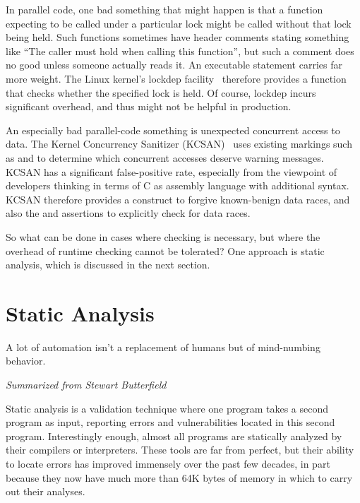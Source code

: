 In parallel code, one bad something that might happen is that
a function expecting to be called under a particular lock might be called
without that lock being held.
Such functions sometimes have header comments stating something like
``The caller must hold  when calling this function'', but
such a comment does no good unless someone actually reads it.
An executable statement carries far more weight.
The Linux kernel's lockdep
facility~\cite{JonathanCorbet2006lockdep,StevenRostedt2011locdepCryptic}
therefore provides a  function that checks
whether the specified lock is held.
Of course, lockdep incurs significant overhead, and thus might not be
helpful in production.

An especially bad parallel-code something is unexpected concurrent
access to data.
The Kernel Concurrency Sanitizer (KCSAN)~\cite{JonathanCorbet2019KCSAN}
uses existing markings such as  and 
to determine which concurrent accesses deserve warning messages.
KCSAN has a significant false-positive rate, especially from the
viewpoint of developers thinking in terms of C as assembly language
with additional syntax.
KCSAN therefore provides a  construct to forgive
known-benign data races, and also the 
and  assertions to explicitly check
for data races\cite{MarcoElver2020FearDataRaceDetector1,MarcoElver2020FearDataRaceDetector2}.

So what can be done in cases where checking is necessary, but where the
overhead of runtime checking cannot be tolerated?
One approach is static analysis, which is discussed in the next section.

\section{Static Analysis}
\label{sec:debugging:Static Analysis}
%
\epigraph{A lot of automation isn't a replacement of
	  humans but of mind-numbing behavior.}
	 {\emph{Summarized from Stewart Butterfield}}

Static analysis is a validation technique where one program takes a second
program as input, reporting errors and vulnerabilities located in this
second program.
Interestingly enough, almost all programs are statically analyzed
by their compilers or interpreters.
These tools are far from perfect, but their ability to locate
errors has improved immensely over the past few decades, in part because
they now have much more than 64K bytes of memory in which to carry out their
analyses.

